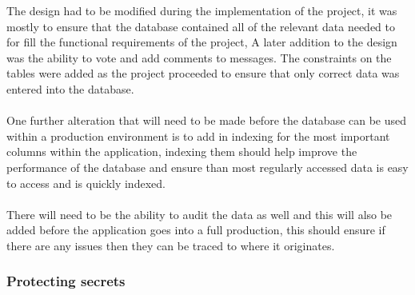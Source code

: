 The design had to be modified during the implementation of the project, it was mostly to ensure that the database contained all of the relevant data needed to for fill the functional requirements of the project, A later addition to the design was the ability to vote and add comments to messages. The constraints on the tables were added as the project proceeded to ensure that only correct data was entered into the database.\\
\\
One further alteration that will need to be made before the database can be used within a production environment is to add in indexing for the most important columns within the application, indexing them should help improve the performance of the database and ensure than most regularly accessed data is easy to access and is quickly indexed.\\
\\
There will need to be the ability to audit the data as well and this will also be added before the application goes into a full production, this should ensure if there are any issues then they can be traced to where it originates.

\subsubsection*{Protecting secrets}
\label{sec:database_security}

